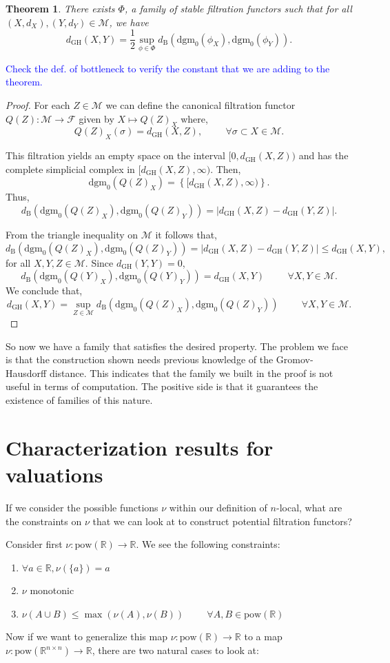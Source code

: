 \documentclass[a4paper,12pt,reqno, english]{amsart}
\newcommand{\dgh}{d_{\mathrm{GH}}}
\newcommand{\dB}{d_{\mathrm{B}}}
\newcommand{\dgm}{\mathrm{dgm}}
\newcommand{\pow}{\mathrm{pow}}
\newcommand{\set}[1]{\{ #1\}}
\newcommand{\R}{\mathbb{R}}
\newcommand{\M}{\mathcal{M}}
\newcommand{\F}{\mathcal{F}}
\theoremstyle{plain}
\newtheorem{thm}{Theorem}[section]
\theoremstyle{definition}
\newcommand{\jose}[1]{\textcolor{blue}{#1} }
\begin{document}
\begin{thm}
There exists $\Phi$, a family of stable filtration functors such that for all $(X,d_X),(Y,d_Y) \in \M$, we have 
$$\dgh(X,Y) = \frac{1}{2}\sup\limits_{\phi \in \Phi}\dB\left(\dgm_0(\phi_X),\dgm_0(\phi_Y)\right).$$
\end{thm}
\jose{Check the def. of bottleneck to verify the constant that we are adding to the theorem.}
\begin{proof}
For each $Z\in\M$ we can define the canonical filtration functor $Q(Z):\M\rightarrow \F$ given by $X\mapsto Q(Z)_X$ where,
$$ Q(Z)_X(\sigma) = \dgh(X,Z), \hspace{1cm} \forall \sigma\subset X \in \M. $$

This filtration yields an empty space on the interval $[0,\dgh(X,Z))$ and has the complete simplicial complex in $[\dgh(X,Z),\infty)$. Then, $$\dgm_0(Q(Z)_X)=\left\{[\dgh(X,Z),\infty)\right\}.$$
Thus, $$\dB(\dgm_0(Q(Z)_X),\dgm_0(Q(Z)_Y))=|\dgh(X,Z)-\dgh(Y,Z)|.$$ 

From the triangle inequality on $\M$ it follows that,
$$\dB(\dgm_0(Q(Z)_X),\dgm_0(Q(Z)_Y))=|\dgh(X,Z)-\dgh(Y,Z)|\leq \dgh(X,Y),$$
for all $X,Y,Z \in \M$. Since $\dgh(Y,Y)=0$,
$$ \dB(\dgm_0(Q(Y)_X),\dgm_0(Q(Y)_Y))= \dgh(X,Y) \hspace{1cm} \forall X,Y \in \M.$$
We conclude that,
$$\dgh(X,Y)= \sup_{Z\in\M}\dB(\dgm_0(Q(Z)_X),\dgm_0(Q(Z)_Y)) \hspace{1cm} \forall X,Y \in \M.$$
\end{proof}

So now we have a family that satisfies the desired property. The problem we face is that the construction shown needs previous knowledge of the Gromov-Hausdorff distance. This indicates that the family we built in the proof is not useful in terms of computation. The positive side is that it guarantees the existence of families of this nature.

\section{Characterization results for valuations}
If we consider the possible functions $\nu$ within our definition of $n$-local, what are the constraints on $\nu$ that we can look at to construct potential filtration functors?

Consider first $\nu: \pow(\R)\rightarrow \R$. We see the following constraints:
\begin{enumerate}
\item $\forall a\in \R, \nu(\set{a}) = a$

\item $\nu$ monotonic

\item $\nu(A\cup B)\le \max(\nu(A),\nu(B)) \hspace{1cm} \forall A,B\in \pow(\R)$
\end{enumerate}
Now if we want to generalize this map $\nu:\pow(\R)\rightarrow \R$ to a map $\nu:\pow(\R^{n\times n})\rightarrow \R$, there are two natural cases to look at:
\end{document}
